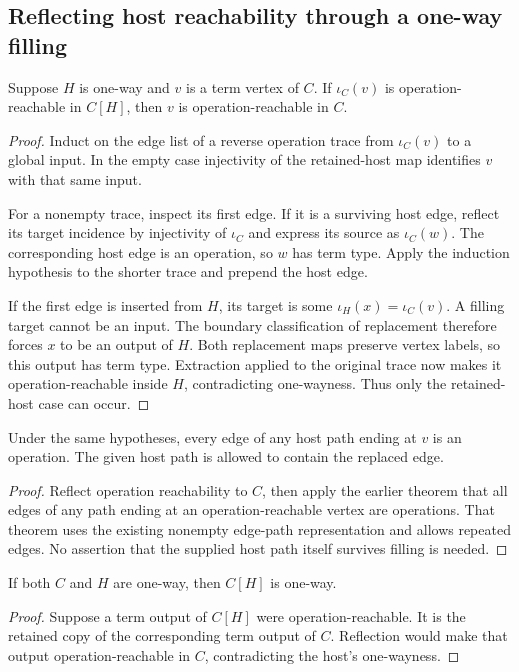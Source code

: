 \subsection{Reflecting host reachability through a one-way filling}
\begin{theorem}
Suppose $H$ is one-way and $v$ is a term vertex of $C$. If $\iota_C(v)$ is
operation-reachable in $C[H]$, then $v$ is operation-reachable in $C$.
\end{theorem}
\begin{proof}
Induct on the edge list of a reverse operation trace from $\iota_C(v)$ to
a global input. In the empty case injectivity of the retained-host map
identifies $v$ with that same input.

For a nonempty trace, inspect its first edge. If it is a surviving host
edge, reflect its target incidence by injectivity of $\iota_C$ and express
its source as $\iota_C(w)$. The corresponding host edge is an operation,
so $w$ has term type. Apply the induction hypothesis to the shorter trace
and prepend the host edge.

If the first edge is inserted from $H$, its target is some
$\iota_H(x)=\iota_C(v)$. A filling target cannot be an input. The boundary
classification of replacement therefore forces $x$ to be an output of $H$.
Both replacement maps preserve vertex labels, so this output has term type.
Extraction applied to the original trace now makes it operation-reachable
inside $H$, contradicting one-wayness. Thus only the retained-host case
can occur.
\end{proof}

\begin{theorem}
Under the same hypotheses, every edge of any host path ending at $v$ is an
operation. The given host path is allowed to contain the replaced edge.
\end{theorem}
\begin{proof}
Reflect operation reachability to $C$, then apply the earlier theorem that
all edges of any path ending at an operation-reachable vertex are operations.
That theorem uses the existing nonempty edge-path representation and allows
repeated edges. No assertion that the supplied host path itself survives
filling is needed.
\end{proof}

\begin{theorem}
If both $C$ and $H$ are one-way, then $C[H]$ is one-way.
\end{theorem}
\begin{proof}
Suppose a term output of $C[H]$ were operation-reachable. It is the retained
copy of the corresponding term output of $C$. Reflection would make that
output operation-reachable in $C$, contradicting the host's one-wayness.
\end{proof}

